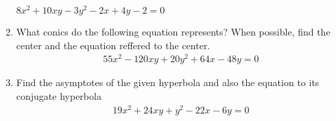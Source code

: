 \begin{enumerate}[label=\thesubsection.\arabic*.,ref=\thesubsection.\theenumi]
$8x^2+10xy-3y^2-2x+4y-2=0$
%
\solution

%
\item What conics do the following equation represents? When possible, find the center and the equation reffered to the center.
\begin{multline}
55x^2 - 120xy + 20y^2 +64x -48y=0
\label{eq:solutions/40/9/eqn1}
\end{multline}
%
\solution

%
\item  Find the asymptotes of the given hyperbola and also the equation to its conjugate hyperbola
\begin{align}
19x^2 + 24xy+y^2-22x-6y=0 \label{eq:solutions/40/10/1.1}
\end{align}
%
\solution

\end{enumerate}


